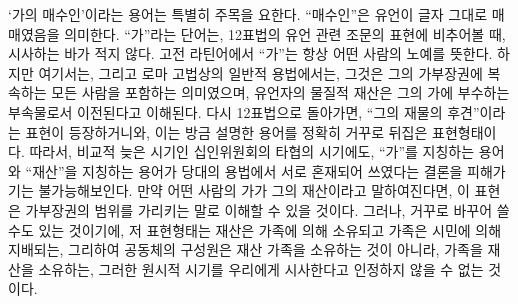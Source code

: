 `가의 매수인'이라는 용어는 특별히 주목을 요한다.
``매수인''은 유언이 글자 그대로 매매였음을 의미한다.
``가''라는 단어는,
12표법의 유언 관련 조문의 표현에 비추어볼 때,
시사하는 바가 적지 않다.
고전 라틴어에서 ``가''는 항상 어떤 사람의 노예를 뜻한다.
하지만 여기서는, 그리고 로마 고법상의 일반적 용법에서는,
그것은 그의 가부장권에 복속하는 모든 사람을 포함하는 의미였으며,
유언자의 물질적 재산은 그의 가에 부수하는 부속물로서
이전된다고 이해된다.
다시 12표법으로 돌아가면, ``그의 재물의 후견''이라는
표현이 등장하거니와, 이는 방금 설명한 용어를 정확히 거꾸로 뒤집은 표현형태이다.
따라서,
비교적 늦은 시기인
십인위원회의 타협의 시기에도,
``가''를 지칭하는 용어와 ``재산''을 지칭하는 용어가 당대의 용법에서
서로 혼재되어 쓰였다는
결론을 피해가기는 불가능해보인다.
만약 어떤 사람의 가가 그의 재산이라고 말하여진다면,
이 표현은 가부장권의 범위를 가리키는 말로 이해할 수 있을 것이다.
그러나, 거꾸로 바꾸어 쓸 수도 있는 것이기에,
저 표현형태는
재산은 가족에 의해 소유되고 가족은 시민에 의해 지배되는,
그리하여 공동체의 구성원은 재산 가족을 소유하는 것이 아니라,
가족을  재산을 소유하는,
그러한 원시적 시기를 우리에게 시사한다고
인정하지 않을 수 없는 것이다.

